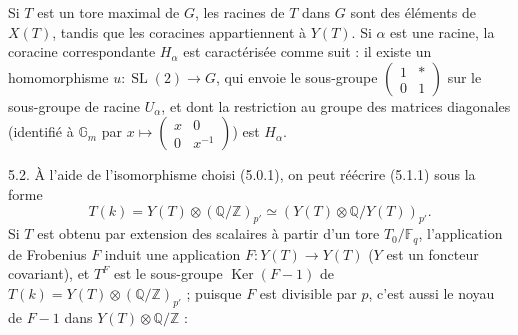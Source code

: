 \documentclass[9pt,twoside]{extarticle}
\begin{document}
{Si \(T\) est un tore maximal de \(G\), les racines de \(T\) dans \(G\) sont des éléments de \(X(T)\), tandis que les coracines appartiennent à \(Y(T)\). Si \(\alpha\) est une racine, la coracine correspondante \(H_\alpha\) est caractérisée comme suit : il existe un homomorphisme \(u:\operatorname{SL}(2)\to G\), qui envoie le sous-groupe \(\begin{pmatrix}1&*\\0&1\end{pmatrix}\) sur le sous-groupe de racine \(U_\alpha\), et dont la restriction au groupe des matrices diagonales (identifié à \(\mathbb G_m\) par \(x\mapsto\begin{pmatrix}x&0\\0&x^{-1}\end{pmatrix}\)) est \(H_\alpha\).\par

5.2. À l'aide de l'isomorphisme choisi (5.0.1), on peut réécrire (5.1.1) sous la forme \[
\tag{5.2.1}
T(k)=Y(T)\otimes(\mathbb Q/\mathbb Z)_{p'}\simeq(Y(T)\otimes\mathbb Q/Y(T))_{p'}.
\] Si \(T\) est obtenu par extension des scalaires à partir d'un tore \(T_0/\mathbb F_q\), l'application de Frobenius \(F\) induit une application \(F:Y(T)\to Y(T)\) (\(Y\) est un foncteur covariant), et \(T^F\) est le sous-groupe \(\operatorname{Ker}(F-1)\) de \(T(k)=Y(T)\otimes(\mathbb Q/\mathbb Z)_{p'}\) ; puisque \(F\) est divisible par \(p\), c'est aussi le noyau de \(F-1\) dans \(Y(T)\otimes\mathbb Q/\mathbb Z\) :\par
}
\end{document}
